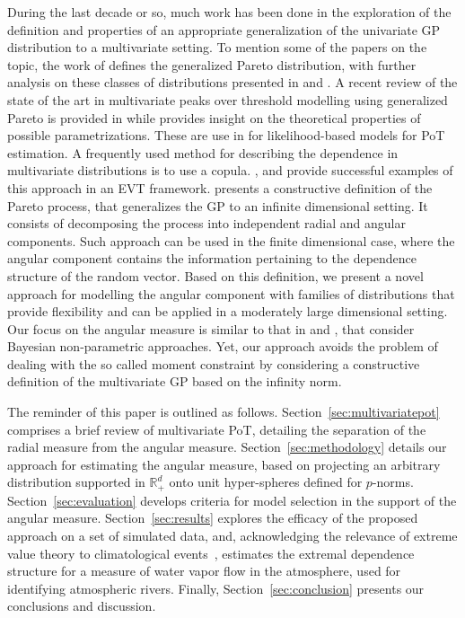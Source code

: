 During the last decade or so, much work has been done in the exploration of the definition 
  and properties of an appropriate generalization of the univariate GP distribution 
  to a multivariate setting.  To mention some of the papers on the topic, the work of
  \citep{rootzen2006} defines the generalized Pareto distribution, with further analysis on these classes
  of distributions presented in \cite{falk2008} and \cite{michel2008}.  A recent review of the state
  of the art in multivariate peaks over threshold modelling using generalized Pareto is provided in
  \cite{rootzen2018} while \cite{RoSeWa2018a} provides insight on the theoretical properties of possible parametrizations. These are use in \cite{KiRoSeWa2019} for likelihood-based models for PoT estimation.
  A frequently used method for describing the dependence
  in multivariate distributions is to use a copula. \cite{renard2007}, and \cite{falk2019} provide successful examples of this approach in an EVT framework. \cite{ferreira2014} presents a constructive definition of the Pareto process, that generalizes the GP to an infinite dimensional setting. It consists of decomposing the process into independent radial and angular components. Such approach can be used in the finite dimensional case, where the angular component 
  contains the information pertaining to the dependence structure of the random vector.
  Based on this definition, we present a novel approach for modelling  the angular component
  with families of distributions that provide flexibility and can be applied in a moderately large dimensional setting.
  Our focus on the  angular measure is similar to that in \cite{SaNa2014} and \cite{HaCaCh2017}, that consider Bayesian non-parametric approaches. Yet, our approach avoids the problem of dealing with the so called moment constraint by considering a constructive definition of the multivariate GP based on the infinity norm.
  
  The reminder of this paper is outlined as follows. Section~\ref{sec:multivariatepot} comprises a brief review of multivariate PoT, detailing the separation of the radial measure from the angular measure.
  Section~\ref{sec:methodology} details our approach for estimating the angular measure, based on projecting an arbitrary distribution supported in ${\mathbb R}_+^d$ onto unit hyper-spheres defined for $p$-norms. Section~\ref{sec:evaluation} develops criteria for model selection in the support of the angular measure.  Section~\ref{sec:results} explores the efficacy of the proposed approach on a set of simulated data, and, acknowledging the relevance of extreme value theory to climatological events~\citep{jentsch2007,vousdoukas2018,li2019}, estimates the extremal dependence structure for a measure of water vapor flow in the atmosphere, used for identifying atmospheric rivers.  Finally, Section~\ref{sec:conclusion} presents our conclusions and discussion.

